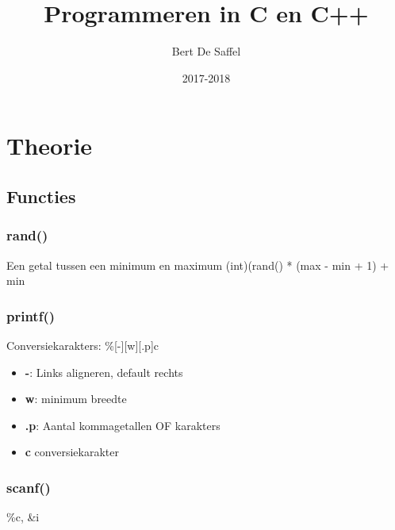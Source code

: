 \documentclass[12pt]{report}
\title{Programmeren in C en C++}
\author{Bert De Saffel}
\date{2017-2018}
\newcommand{\important}[1] {\textbf{\color{orange}#1}}
\begin{document}
\maketitle
\tableofcontents

\part{Theorie}
\chapter{Functies}
\section{rand()}
Een getal tussen een minimum en maximum 
\newline
(int)(rand() * (max - min + 1) + min


\section{printf()}
Conversiekarakters: \%[-][w][.p]c
\begin{itemize}
 \item \important{-}: Links aligneren, default rechts
 \item \important{w}: minimum breedte
 \item \important{.p}: Aantal kommagetallen OF karakters
 \item \important{c} conversiekarakter

\end{itemize}

\section{scanf()}
\%c, &i
\end{document}
